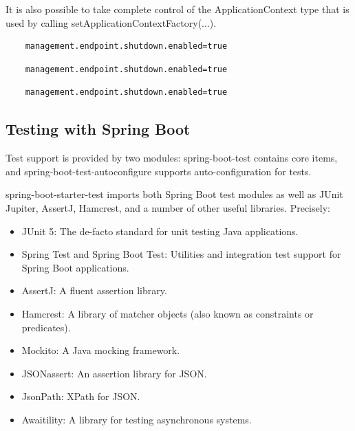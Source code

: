 \documentclass{scrartcl}
\begin{document}
It is also possible to take complete control of the ApplicationContext type that is used by calling setApplicationContextFactory(...).


\begin{lstlisting}
    management.endpoint.shutdown.enabled=true
\end{lstlisting}
\begin{lstlisting}
    management.endpoint.shutdown.enabled=true
\end{lstlisting}
\begin{lstlisting}
    management.endpoint.shutdown.enabled=true
\end{lstlisting}

\subsection{Testing with Spring Boot}

Test support is provided by two modules: spring-boot-test contains core items, and spring-boot-test-autoconfigure supports auto-configuration for tests.

spring-boot-starter-test imports both Spring Boot test modules as well as JUnit Jupiter, AssertJ, Hamcrest, and a number of other useful libraries. Precisely:



\begin{itemize}
    \item JUnit 5: The de-facto standard for unit testing Java applications.

    \item Spring Test and Spring Boot Test: Utilities and integration test support for Spring Boot applications.

    \item AssertJ: A fluent assertion library.

    \item Hamcrest: A library of matcher objects (also known as constraints or predicates).

    \item Mockito: A Java mocking framework.

    \item JSONassert: An assertion library for JSON.

    \item JsonPath: XPath for JSON.

    \item Awaitility: A library for testing asynchronous systems.

\end{itemize}
\end{document}
